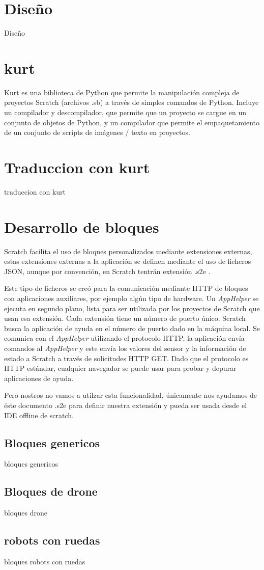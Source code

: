 \section{Diseño}
\label{sec:diseno}

Diseño

\section{kurt}
\label{sec:kurt}

Kurt es una biblioteca de Python que permite la manipulación compleja de proyectos Scratch (archivos .sb) a través de simples comandos de Python. Incluye un compilador y descompilador, que permite que un proyecto se cargue en un conjunto de objetos de Python, y un compilador que permite el empaquetamiento de un conjunto de scripts de imágenes / texto en proyectos.

\section{Traduccion con kurt}
\label{sec:traduccion}

traduccion con kurt

\section{Desarrollo de bloques}
\label{sec:desarrollo-de-bloques}


Scratch facilita el uso de bloques personalizados mediante extensiones externas, estas  extensiones externas a la aplicación se definen mediante el uso de ficheros JSON, aunque por convención, en Scratch tentrán extensión .s2e .

Este tipo de ficheros se creó para la comunicación mediante HTTP de bloques con aplicaciones auxiliares, por ejemplo algún tipo de hardware.
Un \textit{AppHelper} se ejecuta en segundo plano, lista para ser utilizada por los proyectos de Scratch que usan esa extensión.
Cada extensión tiene un número de puerto único. Scratch busca la aplicación de ayuda en el número de puerto dado en la máquina local.
Se comunica con el \textit{AppHelper} utilizando el protocolo HTTP, la aplicación envía comandos al \textit{AppHelper} y este envía los valores del sensor y la información de estado a Scratch a través de solicitudes HTTP GET. Dado que el protocolo es HTTP estándar, cualquier navegador se puede usar para probar y depurar aplicaciones de ayuda.

Pero nostros no vamos a utilzar esta funcionalidad, únicamente nos ayudamos de éste documento .s2e para definir nuestra extensión y pueda ser usada desde el IDE offline de scratch.

\subsection{Bloques genericos}


bloques genericos
\subsection{Bloques de drone}
bloques drone
\subsection{robots con ruedas}
bloques robots con ruedas
